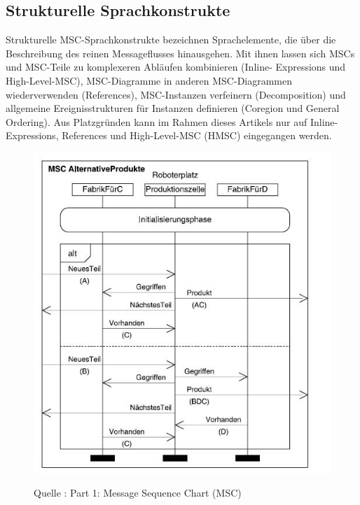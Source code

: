 \subsection{Strukturelle Sprachkonstrukte}
Strukturelle MSC-Sprachkonstrukte bezeichnen Sprachelemente,
die über die Beschreibung des reinen Messageflusses
hinausgehen. Mit ihnen lassen sich MSCs und
MSC-Teile zu komplexeren Abläufen kombinieren (Inline-
Expressions und High-Level-MSC), MSC-Diagramme in
anderen MSC-Diagrammen wiederverwenden (References),
MSC-Instanzen verfeinern (Decomposition) und allgemeine
Ereignisstrukturen für Instanzen definieren (Coregion und
General Ordering). Aus Platzgründen kann im Rahmen
dieses Artikels nur auf Inline-Expressions, References und
High-Level-MSC (HMSC) eingegangen werden.\cite{MT009}\\

\begin{center}
\begin{figure}[h]
   

\includegraphics[scale=1]{Graphics/MSCmit.jpg}



Quelle : \cite{MT009}
Part 1: Message Sequence Chart (MSC) 

 
\label{fig8}


\end{figure}

\end{center}
\newpage
